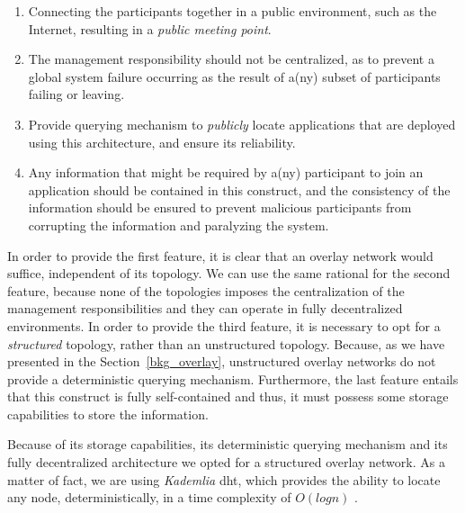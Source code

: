 \documentclass[12pt, titlepage]{uo_temp}
\begin{document}
     \begin{enumerate}
     \item Connecting the participants together in a public environment, such as the
       Internet, resulting in a \emph{public meeting point}.
     \item The management responsibility should not be centralized, as to prevent a global
       system failure occurring as the result of a(ny) subset of participants failing or
       leaving.
     \item Provide querying mechanism to \emph{publicly} locate applications that are
       deployed using this architecture, and ensure its reliability.
     \item Any information that might be required by a(ny) participant to join an application
       should be contained in this construct, and the consistency of the information should be
       ensured to prevent malicious participants from corrupting the information and paralyzing the
       system.
     \end{enumerate}

     In order to provide the first feature, it is clear that an overlay network would
     suffice, independent of its topology. We can use the same rational for the second
     feature, because none of the topologies imposes the centralization of the management
     responsibilities and they can operate in fully decentralized environments. In order
     to provide the third feature, it is necessary to opt for a \emph{structured}
     topology, rather than an unstructured topology. Because, as we have presented in the
     Section~\ref{bkg_overlay}, unstructured overlay networks do not provide a
     deterministic querying mechanism. Furthermore, the last feature entails that this
     construct is fully self-contained and thus, it must possess some storage capabilities
     to store the information.

     Because of its storage capabilities, its deterministic querying mechanism and its
     fully decentralized architecture we opted for a structured overlay network.  As a
     matter of fact, we are using \emph{Kademlia} \gls{dht}, which provides the ability to
     locate any node, deterministically, in a time complexity of $O(log n)$
     \cite{maymounkov2002kademlia}.
\end{document}
